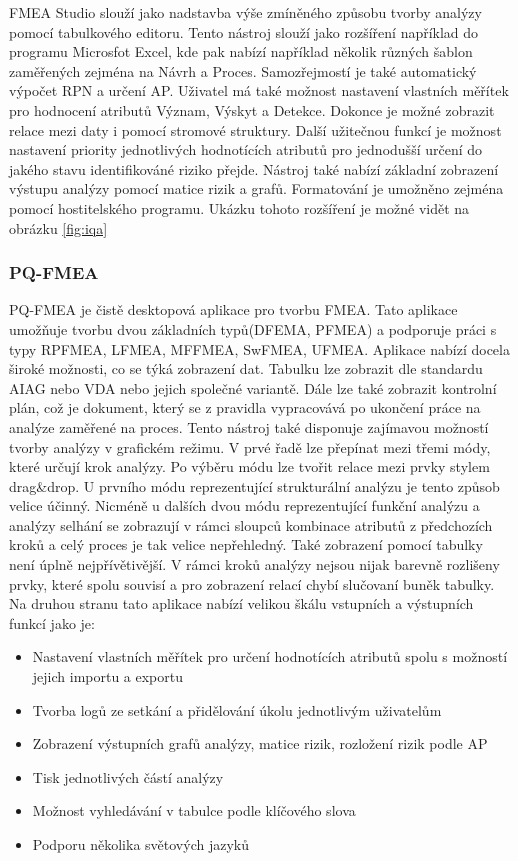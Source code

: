 FMEA Studio slouží jako nadstavba výše zmíněného způsobu tvorby analýzy pomocí tabulkového editoru. Tento nástroj slouží jako rozšíření například do programu Microsfot Excel, kde pak nabízí například několik různých šablon zaměřených zejména na Návrh a Proces. Samozřejmostí je také automatický výpočet RPN a určení AP. Uživatel má také možnost nastavení vlastních měřítek pro hodnocení atributů Význam, Výskyt a Detekce. Dokonce je možné zobrazit relace mezi daty i pomocí stromové struktury. Další užitečnou funkcí je možnost nastavení priority jednotlivých hodnotících atributů pro jednodušší určení do jakého stavu identifikováné riziko přejde. Nástroj také nabízí základní zobrazení výstupu analýzy pomocí matice rizik a grafů. Formatování je umožněno zejména pomocí hostitelského programu. Ukázku tohoto rozšíření je možné vidět na obrázku \ref{fig:iqa}
\break
\break


\subsubsection{PQ-FMEA}
PQ-FMEA je čistě desktopová aplikace pro tvorbu FMEA. Tato aplikace umožňuje tvorbu dvou základních typů(DFEMA, PFMEA) a podporuje práci s typy RPFMEA, LFMEA, MFFMEA, SwFMEA, UFMEA. Aplikace nabízí docela široké možnosti, co se týká zobrazení dat. Tabulku lze zobrazit dle standardu AIAG nebo VDA nebo jejich společné variantě. Dále lze také zobrazit kontrolní plán, což je dokument, který se z pravidla vypracovává po ukončení práce na analýze zaměřené na proces. Tento nástroj také disponuje zajímavou možností tvorby analýzy v grafickém režimu. V prvé řadě lze přepínat mezi třemi módy, které určují krok analýzy. Po výběru módu lze tvořit relace mezi prvky stylem drag\&drop. U prvního módu reprezentující strukturální analýzu je tento způsob velice účinný. Nicméně u dalších dvou módu reprezentující funkční analýzu a analýzy selhání se zobrazují v rámci sloupců kombinace atributů z předchozích kroků a celý proces je tak velice nepřehledný. Také zobrazení pomocí tabulky není úplně nejpřívětivější. V rámci kroků analýzy nejsou nijak barevně rozlišeny prvky, které spolu souvisí a pro zobrazení relací chybí slučovaní buněk tabulky. Na druhou stranu tato aplikace nabízí velikou škálu vstupních a výstupních funkcí jako je:
\begin{itemize}
    \item Nastavení vlastních měřítek pro určení hodnotících atributů spolu s možností jejich importu a exportu
    \item Tvorba logů ze setkání a přidělování úkolu jednotlivým uživatelům
    \item Zobrazení výstupních grafů analýzy, matice rizik, rozložení rizik podle AP 
    \item Tisk jednotlivých částí analýzy
    \item Možnost vyhledávání v tabulce podle klíčového slova
    \item Podporu několika světových jazyků
\end{itemize}

